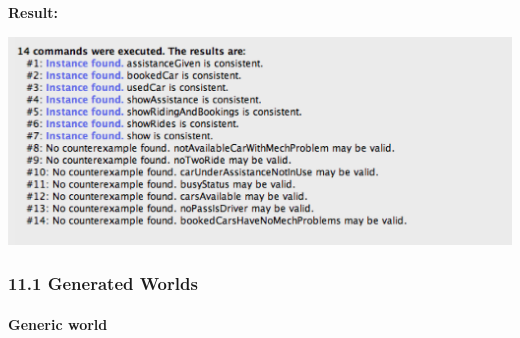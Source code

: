 \documentclass[]{article}
\let\oldparagraph\paragraph
\renewcommand{\paragraph}[1]{\oldparagraph{#1}\mbox{}}
\begin{document}


\textbf{Result:} \newline
\centerline{\includegraphics[width=1.00000\textwidth,height=1.00000\textwidth]{./alloyworlds/result.png}}
\newpage

\subsubsection{11.1 Generated Worlds}\label{generated-worlds}

\paragraph{Generic world}\label{generic-world}
\end{document}
